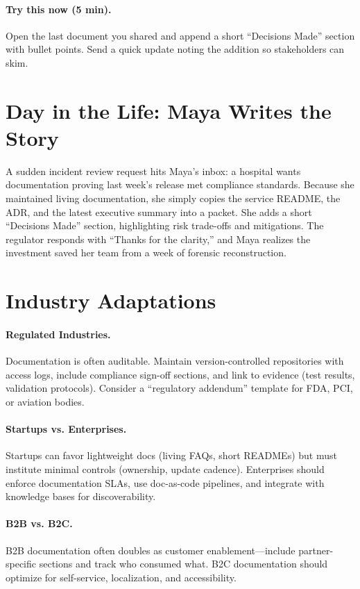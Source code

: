 \paragraph{Try this now (5 min).} Open the last document you shared and append a short ``Decisions Made'' section with bullet points. Send a quick update noting the addition so stakeholders can skim.

\section{Day in the Life: Maya Writes the Story}
A sudden incident review request hits Maya’s inbox: a hospital wants documentation proving last week's release met compliance standards. Because she maintained living documentation, she simply copies the service README, the ADR, and the latest executive summary into a packet. She adds a short ``Decisions Made'' section, highlighting risk trade-offs and mitigations. The regulator responds with ``Thanks for the clarity,'' and Maya realizes the investment saved her team from a week of forensic reconstruction.
\section{Industry Adaptations}
\label{sec:docs-industry}
\paragraph{Regulated Industries.} Documentation is often auditable. Maintain version-controlled repositories with access logs, include compliance sign-off sections, and link to evidence (test results, validation protocols). Consider a ``regulatory addendum'' template for FDA, PCI, or aviation bodies.

\paragraph{Startups vs. Enterprises.} Startups can favor lightweight docs (living FAQs, short READMEs) but must institute minimal controls (ownership, update cadence). Enterprises should enforce documentation SLAs, use doc-as-code pipelines, and integrate with knowledge bases for discoverability.

\paragraph{B2B vs. B2C.} B2B documentation often doubles as customer enablement—include partner-specific sections and track who consumed what. B2C documentation should optimize for self-service, localization, and accessibility.

